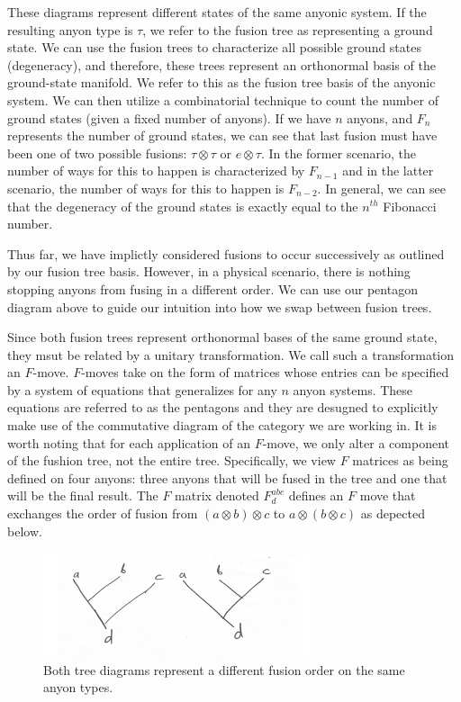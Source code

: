 \documentclass[10pt]{ucthesis}
\begin{document}
These diagrams represent different states of the same anyonic system. If the resulting anyon type is $\tau$, we refer to the fusion tree as representing a ground state. We can use the fusion trees to characterize all possible ground states (degeneracy), and therefore, these trees represent an orthonormal basis of the ground-state manifold\cite{Trebst}. We refer to this as the fusion tree basis of the anyonic system. We can then utilize a combinatorial technique to count the number of ground states (given a fixed number of anyons). If we have $n$ anyons, and $F_n$ represents the number of ground states, we can see that last fusion must have been one of two possible fusions: $\tau\otimes \tau$ or $e \otimes \tau$. In the former scenario, the number of ways for this to happen is characterized by $F_{n-1}$ and in the latter scenario, the number of ways for this to happen is $F_{n-2}$. In general, we can see that the degeneracy of the ground states is exactly equal to the $n^{th}$ Fibonacci number.

Thus far, we have implictly considered fusions to occur successively as outlined by our fusion tree basis. However, in a physical scenario, there is nothing stopping anyons from fusing in a different order. We can use our pentagon diagram above to guide our intuition into how we swap between fusion trees.

Since both fusion trees represent orthonormal bases of the same ground state, they msut be related by a unitary transformation. We call such a transformation an $F$-move. $F$-moves take on the form of matrices whose entries can be specified by a system of equations that generalizes for any $n$ anyon systems. These equations are referred to as the pentagons and they are desugned to explicitly make use of the commutative diagram of the category we are working in. It is worth noting that for each application of an $F$-move, we only alter a component of the fushion tree, not the entire tree. Specifically, we view $F$ matrices as being defined on four anyons: three anyons that will be fused in the tree and one that will be the final result. The $F$ matrix denoted $F^{abc}_d$ defines an $F$ move that exchanges the order of fusion from $(a\otimes b)\otimes c$ to $a\otimes(b\otimes c)$ as depected below.

\begin{figure}[H]
	\centering
	\includegraphics[width=0.7\textwidth]{differentftb}
	\caption{Both tree diagrams represent a different fusion order on the same anyon types.}
\end{figure}
\end{document}
